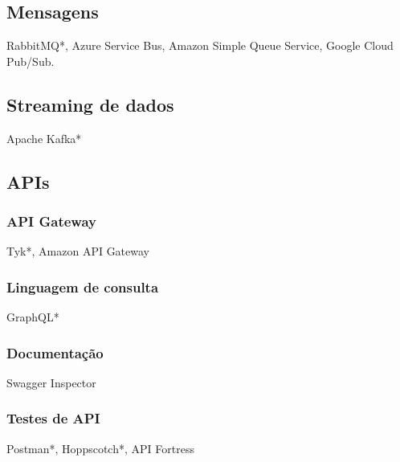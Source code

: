 \subsection{Mensagens}
RabbitMQ*, Azure Service Bus, Amazon Simple Queue Service, Google Cloud Pub/Sub.

\subsection{Streaming de dados}
Apache Kafka*

\subsection{APIs}

\subsubsection{API Gateway}
Tyk*, Amazon API Gateway

\subsubsection{Linguagem de consulta}
GraphQL*

\subsubsection{Documentação}
Swagger Inspector


\subsubsection{Testes de API}\label{ferramentas-testes-apis}
Postman*, Hoppscotch*, API Fortress


